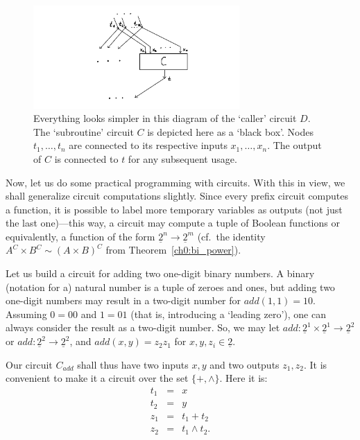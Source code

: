 \documentclass[12pt,notitlepage]{article}
\theoremstyle{plain}
\theoremstyle{definition}
\theoremstyle{plain}
\newcommand{\ul}[1]{\underline{#1}}
\newcommand{\1}{\mathbf{1}}
\newcommand{\0}{\mathbf{0}}
\begin{document}
\begin{figure}[h]
\centering
\includegraphics*[width=0.7\textwidth]{circuits_subst.pdf}
\caption{Everything looks simpler in this diagram of the `caller' circuit $D$. The `subroutine' circuit $C$ is depicted here as a `black box'. Nodes $t_1, \ldots, t_n$ are connected to its respective inputs $x_1, \ldots, x_n$. The output of $C$ is connected to $t$ for any subsequent usage.}
\end{figure}

Now, let us do some practical programming with circuits. With this in view, we shall generalize circuit computations slightly. Since every prefix circuit computes a function, it is possible to label more temporary variables as outputs (not just the last one)---this way, a circuit may compute a tuple of Boolean functions or equivalently, a function of the form $\ul{2}^n \to \ul{2}^m$ (cf.~the identity $A^C \times B^C \sim (A \times B)^C$ from Theorem~\ref{ch0:bi_power}).

Let us build a circuit for adding two one-digit binary numbers. A binary (notation for a) natural number is a tuple of zeroes and ones, but adding two one-digit numbers may result in a two-digit number for $add(1, 1) = 10$. Assuming $0 = 00$ and $1 = 01$ (that is, introducing a `leading zero'), one can always consider the result as a two-digit number. So, we may let $add\colon \ul{2}^1 \times \ul{2}^1 \to \ul{2}^2$ or $add\colon \ul{2}^2 \to \ul{2}^2$, and $add(x, y) = z_2 z_1$ for $x, y, z_i \in \ul{2}$.

Our circuit $C_{add}$ shall thus have two inputs $x, y$ and two outputs $z_1, z_2$. It is convenient to make it a circuit over the set $\{{+}, {\wedge}\}$. Here it is:
$$
\begin{array}{rcl}
t_1 &=& x\\
t_2 &=& y\\
z_1 &=& t_1 + t_2\\
z_2 &=& t_1 \wedge t_2.\\
\end{array}
$$
\end{document}
